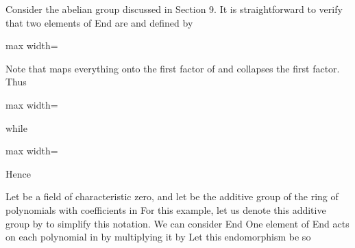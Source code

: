 \documentclass[11pt,oneside]{article}
\begin{document}
\begin{BookBody}

 Consider the abelian group  discussed in Section 9. It is straightforward to verify that two elements of End are \BookInline{\phi } and \BookInline{\psi } defined by

\begin{center}\begin{adjustbox}{max width=\linewidth}\end{adjustbox}\end{center}

\noindent Note that \BookInline{\phi } maps everything onto the first factor of  and \BookInline{\psi } collapses the first factor. Thus

\begin{center}\begin{adjustbox}{max width=\linewidth}\end{adjustbox}\end{center}

\noindent while

\begin{center}\begin{adjustbox}{max width=\linewidth}\end{adjustbox}\end{center}

\noindent Hence  \BookEnd{\blacktriangle}

 Let  be a field of characteristic zero, and let  be the additive group of the ring  of polynomials with coefficients in  For this example, let us denote this additive group by  to simplify this notation. We can consider End One element of End acts on each polynomial in  by multiplying it by  Let this endomorphism be  so


\end{BookBody}
\end{document}
